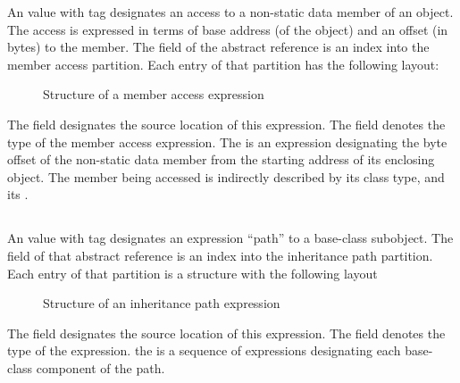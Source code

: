 An  value with tag  designates
an access to a non-static data member of an object.  The access is expressed in terms of 
base address (of the object) and an offset (in bytes) to the member.
The  field of the abstract reference is an index into the member access partition.
Each entry of that partition has the following layout:
%
\begin{figure}[H]
	\centering
	\caption{Structure of a member access expression}
	\label{fig:ifc:ExprSort:MemberAccess}
\end{figure}
%
The  field designates the source location of this expression.
The  field denotes the type of the member access expression.
The  is an expression designating the byte offset of the non-static data member
from the starting address of its enclosing object.
The member being accessed 
is indirectly described by its  class type, and its .



\subsection{}
\label{sec:ifc:ExprSort:InheritancePath}

An  value with tag  designates an expression ``path'' to a base-class subobject.
The  field of that abstract reference is an index into the inheritance path partition.
Each entry of that partition is a structure with the following layout
%
\begin{figure}[H]
	\centering
	\caption{Structure of an inheritance path expression}
	\label{fig:ifc-inheritance-path-expression-structure}
\end{figure}
%
The  field designates the source location of this expression.
The  field denotes the type of the expression.
the  is a sequence of expressions designating each base-class component of the path.

